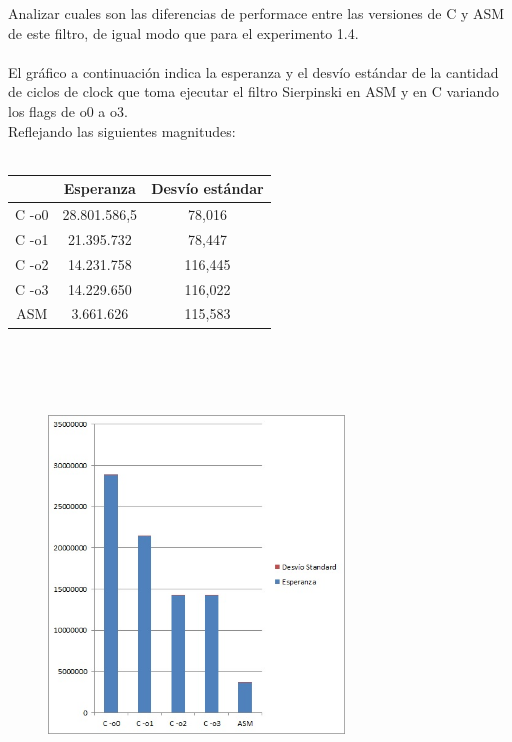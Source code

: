 Analizar cuales son las diferencias de performace entre las versiones de C 
y ASM de este filtro, de igual modo que para el experimento 1.4. \\
\\
El gr\'afico a continuaci\'on indica la esperanza y el desv\'io est\'andar de la cantidad de ciclos de clock que toma ejecutar el filtro Sierpinski en ASM y en C variando los flags de o0 a o3. \\
Reflejando las siguientes magnitudes: \\
\\
 \begin{tabular}[c]{|c|c|c|}
	\hline
		 & Esperanza & Desv\'io est\'andar\\
		\hline
C -o0 & 28.801.586,5 & 78,016 \\
\hline
C -o1 & 21.395.732 & 78,447 \\
\hline
C -o2 & 14.231.758 & 116,445 \\
\hline
C -o3 & 14.229.650 & 116,022 \\
\hline
ASM & 3.661.626 & 115,583 \\
\hline
	\end{tabular}\\\\
\\

\begin{figure}[h!]
  \begin{center}
	\includegraphics[width=0.7\textwidth]{imagenes/21.jpg}
  \end{center}
\end{figure}


